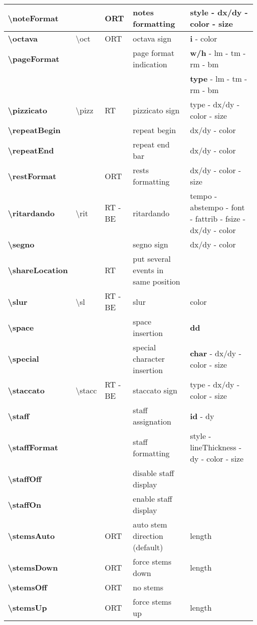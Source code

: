 \documentclass[a4paper, landscape, 10pt]{article}
\begin{document}
\begin{tabularx}{\linewidth}{p{3cm}p{4.5cm}p{3cm}p{5.5cm}l}
    \hline
    \textbf{\textbackslash{}noteFormat}&&ORT&notes formatting&style - dx/dy - color - size\\
    \hline
    \textbf{\textbackslash{}octava}&\textbackslash{}oct&ORT&octava sign&\textbf{i} - color\\
    \hline
    \textbf{\textbackslash{}pageFormat}&&&page format indication&\textbf{w/h} - lm - tm - rm - bm\\
    &&&&\textbf{type} - lm - tm - rm - bm\\
    \hline
    \textbf{\textbackslash{}pizzicato}&\textbackslash{}pizz&RT&pizzicato sign&type - dx/dy - color - size\\
    \hline
    \textbf{\textbackslash{}repeatBegin}&&&repeat begin &dx/dy - color\\
    \hline
    \textbf{\textbackslash{}repeatEnd}&&&repeat end bar&dx/dy - color\\
    \hline
    \textbf{\textbackslash{}restFormat}&&ORT&rests formatting&dx/dy - color - size\\
    \hline
    \textbf{\textbackslash{}ritardando}&\textbackslash{}rit&RT - BE&ritardando&tempo - abstempo - font - fattrib - fsize - dx/dy - color\\
    \hline
    \textbf{\textbackslash{}segno}&&&segno sign&dx/dy - color\\
    \hline
    \textbf{\textbackslash{}shareLocation}&&RT&put several events in same position&\\
    \hline
    \textbf{\textbackslash{}slur}&\textbackslash{}sl&RT - BE&slur&color\\
    \hline
    \textbf{\textbackslash{}space}&&&space insertion&\textbf{dd}\\
    \hline
    \textbf{\textbackslash{}special}&&&special character insertion&\textbf{char} - dx/dy - color - size\\
    \hline
    \textbf{\textbackslash{}staccato}&\textbackslash{}stacc&RT - BE&staccato sign&type - dx/dy - color - size\\
    \hline
    \textbf{\textbackslash{}staff}&&&staff assignation&\textbf{id} - dy\\
    \hline
    \textbf{\textbackslash{}staffFormat}&&&staff formatting&style - lineThickness - dy - color - size\\
    \hline
    \textbf{\textbackslash{}staffOff}&&&disable staff display&\\
    \hline
    \textbf{\textbackslash{}staffOn}&&&enable staff display&\\
    \hline
    \textbf{\textbackslash{}stemsAuto}&&ORT&auto stem direction (default)&length\\
    \hline
    \textbf{\textbackslash{}stemsDown}&&ORT&force stems down&length\\
	\hline
    \textbf{\textbackslash{}stemsOff}&&ORT&no stems&\\
    \hline
    \textbf{\textbackslash{}stemsUp}&&ORT&force stems up&length\\
    \hline
\end{tabularx}
\end{document}
